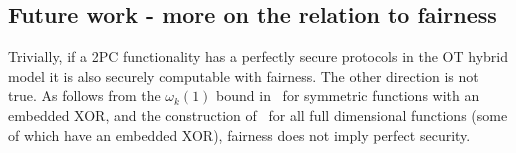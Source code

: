 \documentclass{llncs}
\begin{document}

 





\subsection{Future work - more on the relation to fairness}
Trivially, if a 2PC functionality has a perfectly secure protocols in the OT hybrid model it is also securely computable with fairness.
The other direction is not true. As follows from the $\omega_k(1)$ bound in~\cite{GHKL08} for symmetric functions with an embedded XOR, and the  construction of~\cite{Ash14} for all full dimensional functions (some of which have an embedded XOR), fairness does not imply perfect security. 
\end{document}
